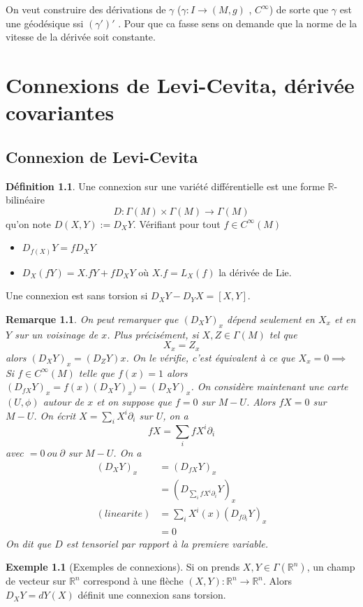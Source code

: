 \documentclass[a4paper,12pt]{book}
\newcommand{\R}{\mathbb{R}}
\theoremstyle{plain}
\newtheorem{rem}{Remarque}
\theoremstyle{definition}
\newtheorem{defn}[subsection]{Définition}
\newtheorem{ex}[subsection]{Exemple}
\theoremstyle{remark}
\begin{document}
On veut construire des dérivations de $\gamma$ ($\gamma\colon I\to (M,g)$
, $C^{\infty}$) de sorte que $\gamma$ est une géodésique ssi $(\gamma')'$
. Pour que ca fasse sens on demande que la norme de la vitesse de la
dérivée soit constante.
\chapter{Connexions de Levi-Cevita, dérivée covariantes}
\section{Connexion de Levi-Cevita}
\begin{defn}
    Une connexion sur une variété différentielle est une forme 
    $\R$-bilinéaire 
    \[D\colon \Gamma(M)\times \Gamma(M)\to \Gamma(M)\]
    qu'on note $D(X,Y):= D_XY$. Vérifiant pour tout $f\in C^{\infty}(M)$
    \begin{itemize}
        \item $D_{f(X)}Y=fD_XY$
        \item $D_X(fY)=X.fY+fD_XY$ où $X.f=L_X(f)$ la dérivée de Lie.
    \end{itemize}
    Une connexion est sans torsion si $D_XY-D_YX=[X,Y]$. 
\end{defn}
\begin{rem}
    On peut remarquer que $(D_XY)_x$ dépend seulement en $X_x$ et en 
    $Y$ sur un voisinage de $x$. Plus précisément, si $X,Z\in \Gamma(M)$
    tel que \[X_x=Z_x\] alors $(D_XY)_x=(D_ZY)x$. On le vérifie, 
    c'est équivalent à ce que $X_x=0\implies $ 
    Si $f\in C^{\infty}(M)$ telle que $f(x)=1$ alors 
    $(D_{fX}Y)_x=f(x)(D_XY)_x)=(D_XY)_x$. On considère maintenant une
    carte $(U,\phi)$ autour de $x$ et on suppose que $f=0$ sur $M-U$.
    Alors $fX=0$ sur $M-U$. On écrit $X=\sum_i X^i\partial_i$ sur $U$, 
    on a
    \[fX=\sum_ifX^i\partial_i\]
    avec $=0~ou~\partial$ sur $M-U$. On a 
    \begin{align*}
        (D_XY)_x&=(D_{fX}Y)_x\\
                &=(D_{\sum_i fX^i\partial_i}Y)_x\\
        (linearite)&=\sum_iX^i(x)(D_{f\partial_i}Y)_x\\
                   &=0
    \end{align*}
    On dit que $D$ est tensoriel par rapport à la premiere variable.
\end{rem}
\begin{ex}[Exemples de connexions]
    Si on prends $X,Y\in \Gamma(\R^n)$, un champ de vecteur sur 
    $\R^n$ correspond à une flèche $(X,Y)\colon\R^n\to\R^n$. Alors
    $D_XY=dY(X)$ définit une connexion sans torsion.
\end{ex}
\end{document}
